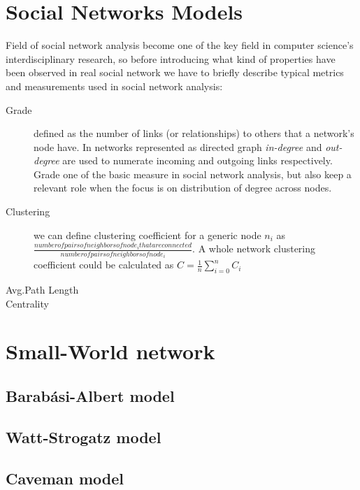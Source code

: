 \section{Social Networks Models}
\label{social_networks}

Field of social network analysis become one of the key field in  computer science's interdisciplinary research, so before introducing what kind of properties have been observed in real social network we have to briefly describe typical metrics and measurements used in social network analysis:
\begin{description}
\item [Grade] defined as the number of links (or relationships) to others that a network's node have\cite{newman:2010}. In networks represented as directed graph \emph{in-degree} and \emph{out-degree} are used to numerate incoming and outgoing links respectively. Grade one of the basic measure in social network analysis, but also keep a relevant role when the focus is on distribution of degree across nodes.
\item [Clustering] we can define clustering coefficient for a generic node $n_{i}$ as $\frac{number of pairs of neighbors of node_{i} that are connected}{number of pairs of neighbors of node_{i}}$. A whole network clustering coefficient could be calculated as $C=\frac{1}{n} \sum_{i=0}^{n} C_{i}$ \cite{watts1998cds}
\item [Avg.Path Length]
\item [Centrality]
\end{description}


\section{Small-World network}
\label{sn_smallworld}


\subsection{Barabási-Albert model}
\label{sn_ba_model}


\subsection{Watt-Strogatz model}
\label{sn_ws_model}

\subsection{Caveman model}
\label{sn_caveman_model}



